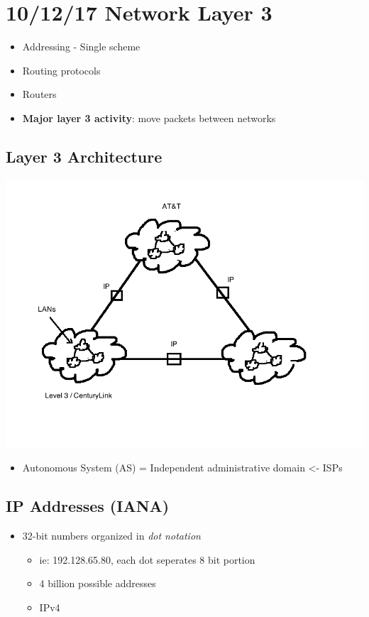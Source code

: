 \documentclass[11pt]{article}
\begin{document}
\section{10/12/17  Network Layer 3}
\label{sec:orgheadline60}
\begin{itemize}
\item Addressing - Single scheme
\item Routing protocols
\item Routers
\item \textbf{Major layer 3 activity}: move packets between networks
\end{itemize}

\subsection{Layer 3 Architecture}
\label{sec:orgheadline54}
\includegraphics[width=.9\linewidth]{diagrams/layer3.png}
\begin{itemize}
\item Autonomous System (AS) = Independent administrative domain <- ISPs
\end{itemize}

\subsection{IP Addresses (IANA)}
\label{sec:orgheadline59}
\begin{itemize}
\item 32-bit numbers organized in \emph{dot notation}
\begin{itemize}
\item ie: 192.128.65.80, each dot seperates 8 bit portion
\item 4 billion possible addresses
\item IPv4
\end{itemize}
\end{itemize}
\end{document}
